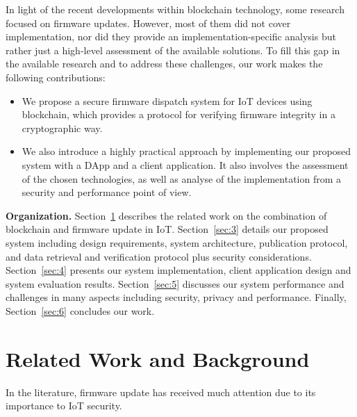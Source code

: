\documentclass[conference]{IEEEtran}
\begin{document}
In light of the recent developments within blockchain technology, some research focused on firmware updates. However, most of them did not cover implementation, nor did they provide an implementation-specific analysis but rather just a high-level assessment of the available solutions.
To fill this gap in the available research and to address these challenges, our work makes the following contributions:

\begin{itemize}
    \item We propose a secure firmware dispatch system for IoT devices using blockchain, which provides a protocol for verifying firmware integrity in a cryptographic way.
    \item We also introduce a highly practical approach by implementing our proposed system with a DApp and a client application. It also involves the assessment of the chosen technologies, as well as analyse of the implementation from a security and performance point of view.
\end{itemize}


\textbf{Organization.} Section~\ref{sec:2} describes the related work on the combination of blockchain and firmware update in IoT. Section~\ref{sec:3} details our proposed system including design requirements, system architecture, publication protocol, and data retrieval and verification protocol plus security considerations. Section~\ref{sec:4} presents our system implementation, client application design and system evaluation results. Section~\ref{sec:5} discusses our system performance and challenges in many aspects including security, privacy and performance. Finally, Section~\ref{sec:6} concludes our work.
	
\section{Related Work and Background}\label{sec:2}
In the literature, firmware update has received much attention due to its importance to IoT security.
\end{document}
